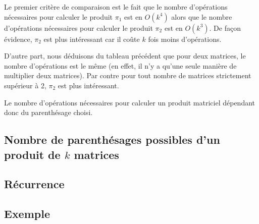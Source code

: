 Le premier critère de comparaison est le fait que le nombre d'opérations nécessaires pour calculer le produit $\pi_1$ est en $O(k^4)$ alors que le nombre d'opérations nécessaires pour calculer le produit $\pi_2$ est en $O(k^3)$. De façon évidence, $\pi_2$ est plus intéressant car il coûte $k$ fois moins d'opérations.

D'autre part, nous déduisons du tableau précédent que pour deux matrices, le nombre d'opérations est le même (en effet, il n'y a qu'une seule manière de multiplier deux matrices). Par contre pour tout nombre de matrices strictement supérieur à 2, $\pi_2$ est plus intéressant.

Le nombre d'opérations nécessaires pour calculer un produit matriciel dépendant donc du parenthésage choisi.

 
 
\subsection{Nombre de parenthésages possibles d'un produit de $k$ matrices}

\subsection{Récurrence}


\subsection{Exemple}
